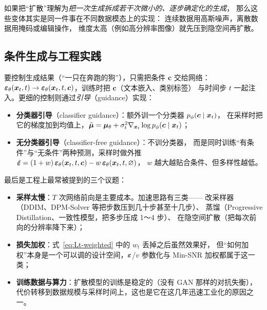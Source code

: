 \begin{remark}[一个统一的理解]
如果把“扩散”理解为\emph{把一次生成拆成若干次微小的、逐步确定化的生成}，
那么这些变体其实是同一件事在不同数据模态上的实现：
连续数据用高斯噪声，离散数据用掩码或编辑操作，
维度太高（例如高分辨率图像）就先压到隐空间再扩散。
\end{remark}

\subsection{条件生成与工程实践}

要控制生成结果（“一只在奔跑的狗”），只需把条件 $\bm{c}$ 交给网络：
$\bm{\varepsilon}_\theta(\bm{x}_t,t)\to\bm{\varepsilon}_\theta(\bm{x}_t,t,\bm{c})$，训练时把 $\bm{c}$（文本嵌入、类别标签）
与时间步 $t$ 一起注入。更细的控制则通过\emph{引导}（guidance）实现：

\begin{itemize}
  \item \textbf{分类器引导}（classifier guidance）：额外训一个分类器 $p_\phi(\bm{c}\mid\bm{x}_t)$，
        在采样时把它的梯度加到均值上，$\tilde{\bm{\mu}}=\bm{\mu}_\theta+\sigma_t^2\nabla_{\bm{x}_t}\log p_\phi(\bm{c}\mid\bm{x}_t)$；
  \item \textbf{无分类器引导}（classifier-free guidance）：不训分类器，
        而是同时训练“有条件”与“无条件”两种预测，采样时做外推
        $\tilde{\bm{\varepsilon}}=(1+w)\,\bm{\varepsilon}_\theta(\bm{x}_t,t,\bm{c})-w\,\bm{\varepsilon}_\theta(\bm{x}_t,t,\varnothing)$，
        $w$ 越大越贴合条件、但多样性越低\cite{ho2022cfg}。
\end{itemize}

最后是工程上最常被提到的三个议题：

\begin{itemize}
  \item \textbf{采样太慢}：$T$ 次网络前向是主要成本。加速思路有三类——
        改采样器（DDIM、DPM-Solver 等把步数压到几十步甚至十几步）、
        蒸馏（Progressive Distillation、一致性模型，把多步压成 1～4 步）、
        在隐空间扩散（把每次前向的分辨率降下来）；
  \item \textbf{损失加权}：式~\eqref{eq:Lt-weighted} 中的 $w_t$ 丢掉之后虽然效果好，
        但“如何加权”本身是一个可以调的设计空间，$\bm{\varepsilon}$/$v$ 参数化与 Min-SNR 加权都属于这一类；
  \item \textbf{训练数据与算力}：扩散模型的训练是稳定的（没有 GAN 那样的对抗失衡），
        代价转移到数据规模与采样时间上，这也是它在这几年迅速工业化的原因之一。
\end{itemize}
